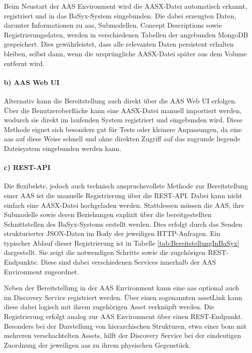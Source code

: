 Beim Neustart der AAS Environment wird die AASX-Datei automatisch erkannt, registriert und in das BaSyx-System eingebunden.
Die dabei erzeugten Daten, darunter Informationen zu \acs{aas}, Submodellen, Concept Descriptions sowie Registrierungsdaten, werden in verschiedenen Tabellen der angebunden MongoDB gespeichert.
Dies gewährleistet, dass alle relevanten Daten persistent erhalten bleiben, selbst dann, wenn die ursprüngliche AASX-Datei später aus dem Volume entfernt wird.

\paragraph*{b) AAS Web UI}
Alternativ kann die Bereitstellung auch direkt über die AAS Web UI erfolgen.
Über die Benutzeroberfläche kann eine AASX-Datei manuell importiert werden, wodurch sie direkt im laufenden System registriert und eingebunden wird.
Diese Methode eignet sich besonders gut für Tests oder kleinere Anpassungen, da eine \acs{aas} auf diese Weise schnell und ohne direkten Zugriff auf das zugrunde liegende Dateisystem eingebunden werden kann.

\paragraph*{c) REST-API}
Die flexibelste, jedoch auch technisch anspruchsvollste Methode zur Bereitstellung einer AAS ist die manuelle Registrierung über die REST-API. 
Dabei kann nicht einfach eine AASX-Datei hochgeladen werden. 
Stattdessen müssen die AAS, ihre Submodelle sowie deren Beziehungen explizit über die bereitgestellten Schnittstellen des BaSyx-Systems erstellt werden. 
Dies erfolgt durch das Senden strukturierter JSON-Daten im Body der jeweiligen HTTP-Anfragen.
Ein typischer Ablauf dieser Registrierung ist in Tabelle \ref{tab:BereitstellungInBaSyx} dargestellt. 
Sie zeigt die notwendigen Schritte sowie die zugehörigen REST-Endpunkte.
Diese sind dabei verschiedenen Services innerhalb der AAS Environment zugeordnet.



Neben der Bereitstellung in der AAS Environment kann eine \acs{aas} optional auch im Discovery Service registriert werden.
Über einen sogenannten assetLink kann diese dabei logisch mit ihrem zugehörigen Asset verknüpft werden.
Die Registrierung erfolgt analog zur AAS Environment über einen REST-Endpunkt.
Besonders bei der Darstellung von hierarchischen Strukturen, etwa einer \acs{bom} mit mehreren verschachtelten Assets, hilft der Discovery Service bei der eindeutigen Zuordnung der jeweiligen \acs{aas} zu ihrem physischen Gegenstück.

